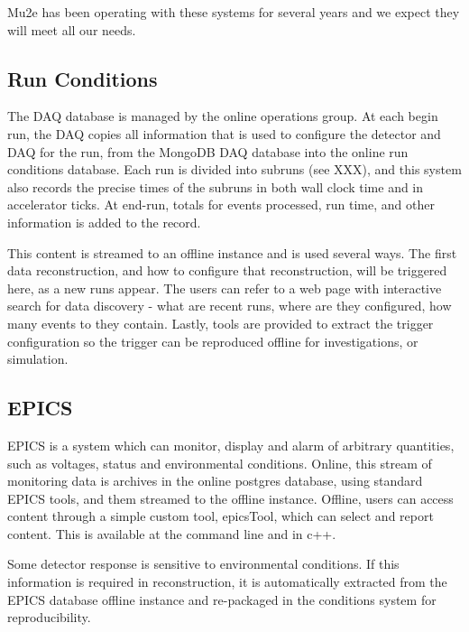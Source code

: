 Mu2e has been operating with these systems for several years and we expect they will meet all our needs.


\subsection{Run Conditions} \label{database-run}
The DAQ database is managed by the online operations group.  At each begin run, the DAQ copies all information that is used to configure the detector and DAQ for the run, from the MongoDB DAQ database into the online run conditions database.   Each run is divided into subruns (see XXX), and this system also records the precise times of the subruns in both wall clock time and in accelerator ticks.
At end-run, totals for events processed, run time, and other information is added to the record.

This content is streamed to an offline instance and is used several ways.  The first data reconstruction, and how to configure that reconstruction, will be triggered here, as a new runs appear.  The users can refer to a web page with interactive search for data discovery - what are recent runs, where are they configured, how many events to they contain.  Lastly, tools are provided to extract the trigger configuration so the trigger can be reproduced offline for investigations, or simulation. 

\subsection{EPICS} \label{database-epics}
EPICS is a system which can monitor, display and alarm of arbitrary quantities, such as voltages, status and environmental conditions. Online, this stream of monitoring data is archives in the online postgres database, using standard EPICS tools, and them streamed to the offline instance.  Offline, users can access content through a simple custom tool, epicsTool, which can select and report content.  This is available at the command line and in c++.

Some detector response is sensitive to environmental conditions.  If this information is required in reconstruction, it is automatically extracted from the EPICS database offline instance and re-packaged in the conditions system for reproducibility.

